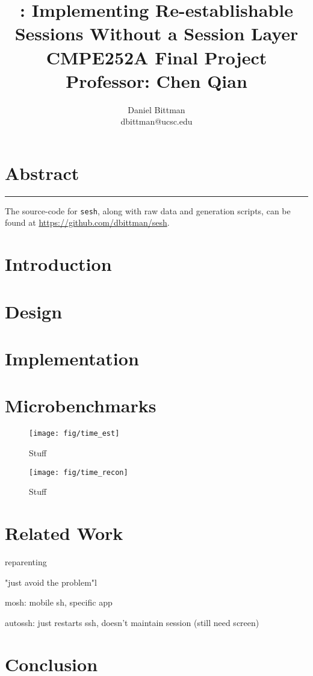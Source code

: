 \documentclass[twocolumn,10pt]{article}
\author{Daniel Bittman \\ dbittman@ucsc.edu}
\title{\sesh: \textbf{Implementing Re-establishable\\Sessions Without a Session Layer}
\\
{\vspace{5mm}\normalsize CMPE252A Final Project\\\vspace{-3mm} Professor: Chen Qian}
}
\newcommand{\sesh}{\texttt{sesh}\xspace}
\begin{document}
\biolinum
\maketitle
\libertine 
\section*{Abstract}


\begin{center}\noindent\rule{2cm}{0.4pt}\end{center}

The source-code for \sesh, along with raw data and generation scripts,
can be found at \url{https://github.com/dbittman/sesh}.

\section{Introduction}





\section{Design}



\section{Implementation}



\section{Microbenchmarks}


\begin{figure}
	\centering
	\texttt{[image: fig/time\_est]}
	\caption{Stuff}
	\label{fig:est}
\end{figure}

\begin{figure}
	\centering
	\texttt{[image: fig/time\_recon]}
	\caption{Stuff}
	\label{fig:est}
\end{figure}




\section{Related Work}

reparenting

"just avoid the problem"l


mosh: mobile sh, specific app

autossh: just restarts ssh, doesn't maintain session (still need screen)


\section{Conclusion}















\end{document}
